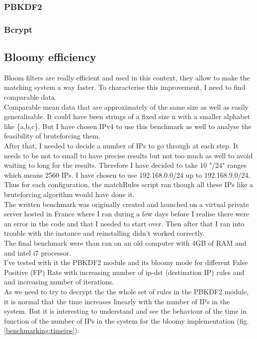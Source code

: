 \documentclass{eplmastersthesis}
\begin{document}
\subsubsection{PBKDF2}
\subsubsection{Bcrypt}


\subsection{Bloomy efficiency}

Bloom filters are really efficient and used in this context, they allow to make the matching system a way faster. To characterise this improvement, I need to find comparable data.\\
Comparable mean data that are approximately of the same size as well as easily generalisable. It could have been strings of a fixed size n with a smaller alphabet like \{a,b,c\}. But I have chosen IPv4 to use this benchmark as well to analyse the feasibility of  bruteforcing them.\\
After that, I needed to decide a number of IPs to go through at each step. It needs to be not to small to have precise results but not too much as well to avoid waiting to long for the results. Therefore I have decided to take 10 "/24" ranges which means 2560 IPs. I have chosen to use 192.168.0.0/24 up to 192.168.9.0/24.\\
Thus for each configuration, the matchRules script ran though all these IPs like a bruteforcing algorithm would have done it.\\

The written benchmark was originally created and launched on a virtual private server hosted in France where I ran during a few days before I realise there were an error in the code and that I needed to start over. Then after that I ran into trouble with the instance and reinstalling didn't worked correctly.\\
The final benchmark were than ran on an old computer with 4GB of RAM and and intel i7 processor.\\
I've tested with it the PBKDF2 module and its bloomy mode for different False Positive (FP) Rate with increasing number of ip-dst (destination IP) rules and and increasing number of iterations.\\

As we need to try to decrypt the the whole set of rules in the PBKDF2 module, it is normal that the time increases linearly with the number of IPs in the system. But it is interesting to understand and see the behaviour of the time in function of the number of IPs in the system for the bloomy implementation (fig. \ref{benchmarking:timeips}):
\end{document}
